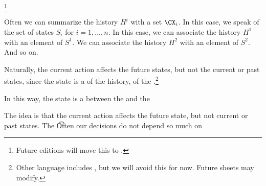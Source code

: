 \footnote{Future editions will move this to .}

Often we can summarize the history $H^i$ with a set $\CX_i$.
In this case, we speak of the set of states $S_i$ for $i = 1, \dots, n$.
In this case, we can associate the history $H^1$ with an element of $S^1$.
We can associate the history $H^2$ with an element of $S^2$.
And so on.

Naturally, the current action affects the future states, but not the current or past states, since the state is a  of the history, of the .\footnote{Other language includes , but we will avoid this for now. Future sheets may modify.}


In this way, the state is a  between the  and the 

The idea is that the current action affects the future state, but not current or past states.
The \t
Often our decisions do not depend so much on


%
%
%
%
